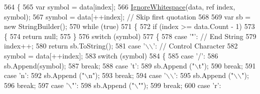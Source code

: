 \begin{DoxyCode}
564         \{
565             var symbol = data[index];
566             \hyperlink{a00046_a2c524a3d0510dd2e4ec91dd63acbf61d}{IgnoreWhitespace}(data, ref index, symbol);
567             symbol = data[++index]; \textcolor{comment}{// Skip first quotation}
568 
569             var sb = \textcolor{keyword}{new} StringBuilder();
570             \textcolor{keywordflow}{while} (\textcolor{keyword}{true})
571             \{
572                 \textcolor{keywordflow}{if} (index >= data.Count - 1)
573                 \{
574                     \textcolor{keywordflow}{return} null;
575                 \}
576                 \textcolor{keywordflow}{switch} (symbol)
577                 \{
578                     \textcolor{keywordflow}{case} \textcolor{charliteral}{'"'}:  \textcolor{comment}{// End String}
579                         index++;
580                         \textcolor{keywordflow}{return} sb.ToString();
581                     \textcolor{keywordflow}{case} \textcolor{charliteral}{'\(\backslash\)\(\backslash\)'}: \textcolor{comment}{// Control Character}
582                         symbol = data[++index];
583                         \textcolor{keywordflow}{switch} (symbol)
584                         \{
585                             \textcolor{keywordflow}{case} \textcolor{charliteral}{'/'}:
586                                 sb.Append(symbol);
587                                 \textcolor{keywordflow}{break};
588                             \textcolor{keywordflow}{case} \textcolor{charliteral}{'t'}:
589                                 sb.Append (\textcolor{stringliteral}{"\(\backslash\)t"});
590                                 \textcolor{keywordflow}{break};
591                             \textcolor{keywordflow}{case} \textcolor{charliteral}{'n'}:
592                                 sb.Append (\textcolor{stringliteral}{"\(\backslash\)n"});
593                                 \textcolor{keywordflow}{break};
594                             \textcolor{keywordflow}{case} \textcolor{charliteral}{'\(\backslash\)\(\backslash\)'}:
595                                 sb.Append (\textcolor{stringliteral}{"\(\backslash\)\(\backslash\)"});
596                                 \textcolor{keywordflow}{break};
597                             \textcolor{keywordflow}{case} \textcolor{charliteral}{'\(\backslash\)"'}:
598                                 sb.Append (\textcolor{stringliteral}{"\(\backslash\)""});
599                                 \textcolor{keywordflow}{break};
600                             \textcolor{keywordflow}{case} \textcolor{charliteral}{'r'}:

\end{DoxyCode}
